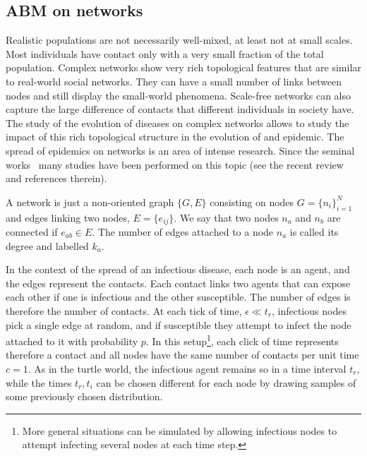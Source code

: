 \documentclass[10pt,letterpaper]{article}
\begin{document}


\subsection*{ABM on networks}

Realistic populations are not necessarily well-mixed, at least not at small scales. 
Most individuals have contact only with a very small fraction of the
total population. 
Complex networks show very rich topological features that are similar
to real-world social networks. They can have a small number of links
between nodes and still display the small-world phenomena. 
Scale-free networks can also capture the large difference of contacts
that different individuals in society have. 
The study of the evolution of diseases on complex networks allows to
study the impact of this rich topological structure in the evolution
of and epidemic. 
The spread of  epidemics  on  networks  is  an  area  of  intense
research. 
Since the seminal works~\cite{Watts1998Collective} many studies have been
performed on this topic (see the recent
review~\cite{Pastor_Satorras_2015} and references therein). 

A network is just a {non-oriented graph} \(\{G,E\}\) consisting on 
nodes \(G=\{n_i\}_{i=1}^N\) and edges linking two nodes, \(E=\{e_{ij}\}\). We say that
two nodes \(n_a\) and \(n_b\) are connected if \(e_{ab}\in E\). The number
of edges attached to a node \(n_a\) is called its degree and labelled
\(k_a\).

In the context of the spread of an infectious disease, each node is
an agent, and the edges represent the contacts. Each contact links two agents that can expose each other if one is infectious and the other susceptible. 
The number of edges is therefore the number of contacts.
At each tick of time, $\epsilon \ll t_r$, infectious nodes
pick a single edge at random, and if susceptible they attempt to
infect the node attached to it with probability $p$. In this
setup\footnote{More general situations can be simulated by allowing
  infectious nodes to attempt infecting several nodes at each time
  step.}, each click of time represents therefore a contact and all nodes have
the same number of contacts per unit time $c =1$. As in the turtle world, the infectious agent remains so in a time interval $t_r$, while  
the times $t_r,t_i$ can be chosen different for each node by drawing samples of some previously chosen
distribution.
\end{document}
